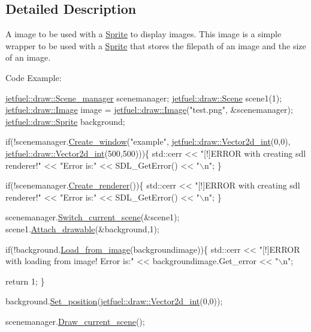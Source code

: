\subsection{Detailed Description}
A image to be used with a \hyperlink{classjetfuel_1_1draw_1_1Sprite}{Sprite} to display images. This image is a simple wrapper to be used with a \hyperlink{classjetfuel_1_1draw_1_1Sprite}{Sprite} that stores the filepath of an image and the size of an image.

Code Example\+: 
\begin{DoxyCode}
  \hyperlink{classjetfuel_1_1draw_1_1Scene__manager}{jetfuel::draw::Scene\_manager} scenemanager;
  \hyperlink{classjetfuel_1_1draw_1_1Scene}{jetfuel::draw::Scene} scene1(1);
  \hyperlink{classjetfuel_1_1draw_1_1Image}{jetfuel::draw::Image} image = \hyperlink{classjetfuel_1_1draw_1_1Image}{jetfuel::draw::Image}(\textcolor{stringliteral}{"test.png"},
                                              &scenemanager);
  \hyperlink{classjetfuel_1_1draw_1_1Sprite}{jetfuel::draw::Sprite} background;

\textcolor{keywordflow}{if}(!scenemanager.\hyperlink{classjetfuel_1_1draw_1_1Scene__manager_a5113e9062c272a22d383ba872417ba31}{Create\_window}(\textcolor{stringliteral}{"example"},
                         \hyperlink{classjetfuel_1_1draw_1_1Vector2d}{jetfuel::draw::Vector2d\_int}(0,0),
                         \hyperlink{classjetfuel_1_1draw_1_1Vector2d}{jetfuel::draw::Vector2d\_int}(500,500)))\{
   std::cerr << \textcolor{stringliteral}{"[!]ERROR with creating sdl renderer!"} <<
   \textcolor{stringliteral}{"Error is:"} << SDL\_GetError() << \textcolor{stringliteral}{"\(\backslash\)n"};
\}

  \textcolor{keywordflow}{if}(!scenemanager.\hyperlink{classjetfuel_1_1draw_1_1Scene__manager_afafecd926ce5e4b2543a6d583a7d24b6}{Create\_renderer}())\{
       std::cerr << \textcolor{stringliteral}{"[!]ERROR with creating sdl renderer!"} <<
      \textcolor{stringliteral}{"Error is:"} << SDL\_GetError() << \textcolor{stringliteral}{"\(\backslash\)n"};
  \}

  scenemanager.\hyperlink{classjetfuel_1_1draw_1_1Scene__manager_a770c163b88ba8427539ee182315ea989}{Switch\_current\_scene}(&scene1);
  scene1.\hyperlink{classjetfuel_1_1draw_1_1Scene_aea4b4c4ae25c30d661be4c52787e0ea3}{Attach\_drawable}(&background,1);

  \textcolor{keywordflow}{if}(!background.\hyperlink{classjetfuel_1_1draw_1_1Sprite_a370d0b3b2770348ae57ae5156c59a0ca}{Load\_from\_image}(backgroundimage))\{
      std::cerr << \textcolor{stringliteral}{"[!]ERROR with loading from image! Error is:"}
      << backgroundimage.Get\_error << \textcolor{stringliteral}{"\(\backslash\)n"};

      \textcolor{keywordflow}{return} 1;
  \}

  background.\hyperlink{classjetfuel_1_1draw_1_1Drawable_afdd035afe40c706459a6c9df813bcce6}{Set\_position}(\hyperlink{classjetfuel_1_1draw_1_1Vector2d}{jetfuel::draw::Vector2d\_int}(0,0));

  scenemanager.\hyperlink{classjetfuel_1_1draw_1_1Scene__manager_a8af9a3abfd5121b1b8556342de435773}{Draw\_current\_scene}();
\end{DoxyCode}
 

